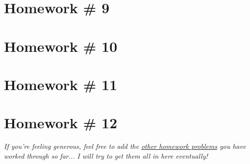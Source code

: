 \section*{Homework \# 9}
\label{sec:HW9}

\section*{Homework \# 10}
\label{sec:HW10}

\section*{Homework \# 11}
\label{sec:HW11}

\section*{Homework \# 12}
\label{sec:HW12}

\vspace{0.35cm}
\textit{If you're feeling generous, feel free to add the \href{https://www.dropbox.com/sh/759pwsjyc3ix0jy/AADBiIq0ZkDsvyEG6fMvSxJta/Abstract\%20Algebra\%20Homework\%20Sets?dl=0&subfolder_nav_tracking=1}{other homework problems} you have worked through so far... I will try to get them all in here eventually!}